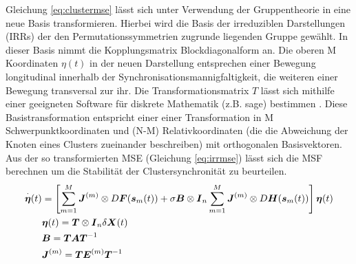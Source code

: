 Gleichung \ref{eq:clustermse} lässt sich unter Verwendung der Gruppentheorie in eine neue Basis transformieren. Hierbei wird die Basis der irreduziblen Darstellungen (IRRs) der den Permutationssymmetrien zugrunde liegenden Gruppe gewählt. In dieser Basis nimmt die Kopplungsmatrix Blockdiagonalform an. Die oberen M Koordinaten $\eta(t)$ in der neuen Darstellung entsprechen einer Bewegung longitudinal innerhalb der Synchronisationsmannigfaltigkeit, die weiteren einer Bewegung transversal zur ihr. Die Transformationsmatrix $T$ lässt sich mithilfe einer geeigneten Software für diskrete Mathematik (z.B. sage) bestimmen \citep{sagenotebook}. Diese Basistransformation entspricht einer einer Transformation in M Schwerpunktkoordinaten und (N-M) Relativkoordinaten (die die Abweichung der Knoten eines Clusters zueinander beschreiben) mit orthogonalen Basisvektoren.
Aus der so transformierten MSE (Gleichung \ref{eq:irrmse}) lässt sich die MSF berechnen um die Stabilität der Clustersynchronität zu beurteilen.
\begin{align}
	\label{eq:irrmse}
		\overset{\cdot}{\boldsymbol{\eta}}(t)&=
				\left[\sum_{m=1}^{M} \boldsymbol{J}^{(m)} \otimes D\boldsymbol{F}(\boldsymbol{s}_m(t))+\sigma\boldsymbol{B}\otimes \boldsymbol{I}_n\sum_{m=1}^{M} \boldsymbol{J}^{(m)}\otimes D\boldsymbol{H}(\boldsymbol{s}_m(t))\right]\boldsymbol{\eta}(t)
		\\\notag &\boldsymbol{\eta}(t)=\boldsymbol{T}\otimes\boldsymbol{I}_n\delta\boldsymbol{X}(t)
		\\\notag & \boldsymbol{B}=\boldsymbol{T}\boldsymbol{A}\boldsymbol{T}^{-1}
		\\\notag & \boldsymbol{J}^{(m)}=\boldsymbol{T}\boldsymbol{E}^{(m)}\boldsymbol{T}^{-1}
		\end{align}
		





